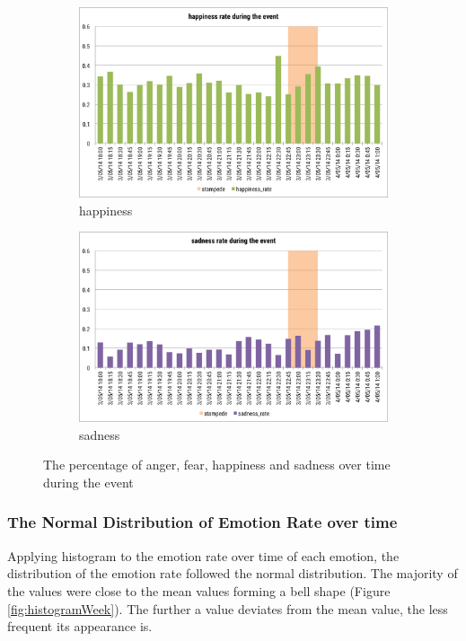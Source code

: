 \begin{figure}[htb!]
\begin{subfigure}{0.5\textwidth} 
\centering    
\includegraphics[width=0.99\linewidth]{HappinessRateEvent}
\caption{happiness}
\label{fig:happinessRateEvent}
\end{subfigure}%
\begin{subfigure}{0.5\textwidth}
\centering    
\includegraphics[width=0.99\linewidth]{SadnessRateEvent}
\caption{sadness}
\label{fig:sadnessRateEvent}
\end{subfigure}
\caption{The percentage of anger, fear, happiness and sadness over time during the event}
\label{fig:rateEvent}
\end{figure}

\subsubsection{The Normal Distribution of Emotion Rate over time}
Applying histogram to the emotion rate over time of each emotion, the distribution of the emotion rate followed the normal distribution. The majority of the values were close to the mean values forming a bell shape (Figure \ref{fig:histogramWeek}). The further a value deviates from the mean value, the less frequent its appearance is.

